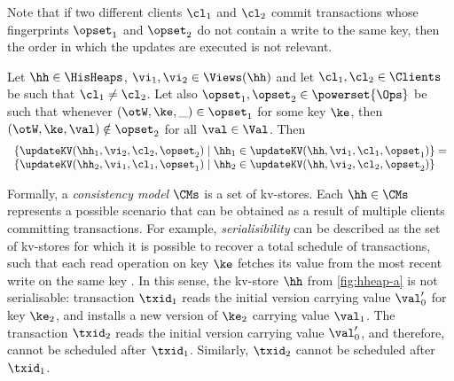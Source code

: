 Note that if two different clients $\cl_1$ and $\cl_2$ commit transactions 
whose fingerprints $\opset_1$ and $\opset_2$ do not contain a write 
to the same key, then the order in which the updates are executed is 
not relevant. 
\begin{proposition}
\label{prop:updatekv.comm}
\label{prop:swap-update}
Let $\hh \in \HisHeaps$, $\vi_1, \vi_2 \in \Views(\hh)$ and let $\cl_1, \cl_2 \in \Clients$ 
be such that $\cl_1 \neq \cl_2$. 
Let also $\opset_1, \opset_2 \in \powerset{\Ops}$ be such that 
whenever $(\otW, \ke, \_) \in \opset_1$ for some key $\ke$, then 
$(\otW, \ke, \val) \notin \opset_2$ for all $\val \in \Val$. Then 
\[
\begin{array}{l}
\{ \updateKV(\hh_1, \vi_2, \cl_2, \opset_2) \mid \hh_1 \in \updateKV(\hh, \vi_1, \cl_1, \opset_1)\} = \\
\{ \updateKV(\hh_2, \vi_1, \cl_1, \opset_1) \mid \hh_2 \in \updateKV(\hh, \vi_2, \cl_2, \opset_2)\}\\
\end{array}
\]
\end{proposition}

Formally, a \emph{consistency model} $\CMs$ is a 
set of kv-stores. Each $\hh \in \CMs$ represents a possible scenario that 
can be obtained as a result of multiple clients committing transactions. 
For example, \emph{serialisibility} can be described as the set 
of kv-stores for which it is possible to recover a total schedule of transactions, 
such that each read operation on key $\ke$ fetches its value from the 
most recent write on the same key \cite{}.
In this sense, the kv-store $\hh$ from \cref{fig:hheap-a} is not serialisable: 
transaction $\txid_1$ reads the initial version carrying value $\val'_0$ for key $\ke_{2}$, 
and installs a new version of $\ke_{2}$ carrying value $\val_1$. The transaction $\txid_2$ 
reads the initial version carrying value $\val'_0$, and therefore, 
cannot be scheduled after $\txid_1$. Similarly, $\txid_2$ cannot be scheduled after $\txid_1$.

